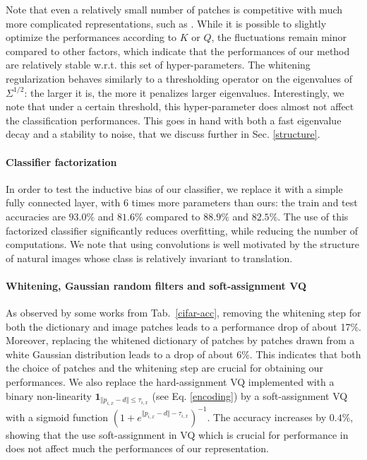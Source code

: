 \documentclass{article}
\begin{document}
Note that even a relatively small number of patches is competitive with much more complicated representations, such as \citet{Oyallon_2015_CVPR}.
While it is possible to slightly optimize the performances according to $K$ or $Q$,  the fluctuations remain minor compared to other factors, which indicate that the performances of our method are relatively stable w.r.t. this set of hyper-parameters. The whitening regularization behaves similarly to a thresholding operator on the eigenvalues of $\Sigma^{1/2}$: the larger it is, the more it penalizes larger eigenvalues. Interestingly, we note that under a certain threshold, this hyper-parameter  does almost not affect the classification performances. This goes in hand with both a fast eigenvalue decay and a stability to noise, that we discuss further in Sec. \ref{structure}.
\vspace{-0.3cm}
\paragraph{Classifier factorization}
In order to test the inductive bias of our classifier, we  replace it with a simple fully connected layer, with $6$ times more parameters than ours: the train and test accuracies are $93.0\%$ and $81.6\%$ compared to $88.9\%$ and $82.5\%$. The use of this factorized classifier significantly reduces overfitting, while reducing the number of computations. We note that using convolutions is well motivated by the  structure of natural images whose class is relatively invariant to translation.
\vspace{-0.3cm}
\paragraph{Whitening, Gaussian random filters and soft-assignment VQ}
As observed by some  works from Tab.~\ref{cifar-acc}, removing the whitening step for both the dictionary and image patches leads to  a  performance drop  of about 17\%.
Moreover, replacing the whitened dictionary of patches by patches drawn from a white Gaussian distribution leads to a drop of about 6\%. This indicates that both the choice of patches and the whitening step are crucial for obtaining our performances. 
We also replace the hard-assignment VQ implemented with a binary non-linearity  $\mathbf{1}_{\Vert  p_{i,x} - d\Vert \leq \tau_{i,x}}$ (see Eq. \ref{encoding}) by a soft-assignment VQ with a sigmoid function $(1 + e^{\Vert  p_{i,x} - d\Vert - \tau_{i,x}})^{-1}$.
The accuracy increases by $0.4\%$, showing that the use soft-assignment in VQ which is crucial for performance in \cite{coates2011analysis,coates2011importance} does not affect much the performances of our representation.
\end{document}
